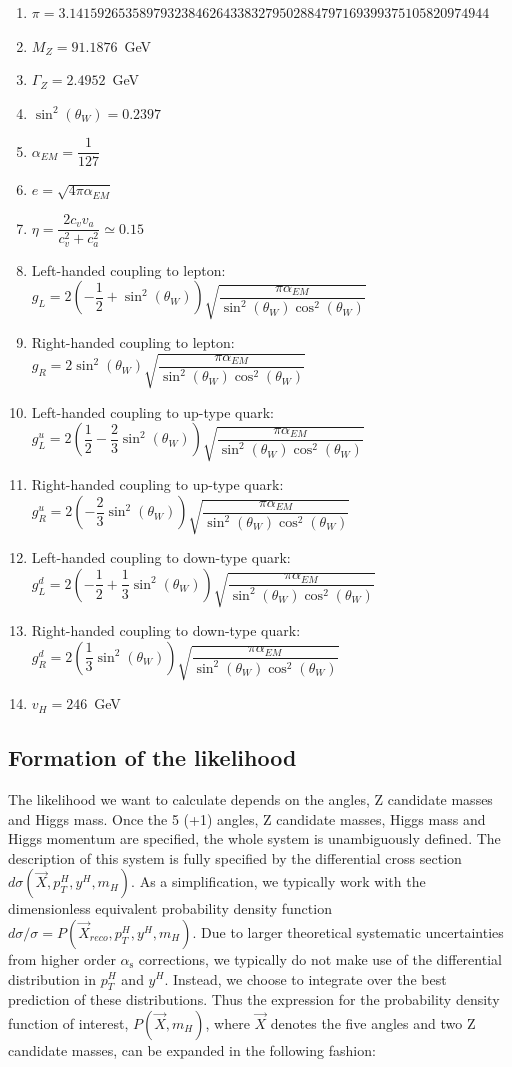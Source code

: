 \documentclass{cmspaper}
\begin{document}
\begin{enumerate}
\item $\pi = 3.141592653589793238462643383279502884797169399375105820974944$
\item $M_Z = 91.1876$~GeV
\item $\Gamma_Z = 2.4952$~GeV
\item $\sin^2(\theta_W) = 0.2397$
\item $\alpha_{EM} = \dfrac{1}{127}$
\item $e = \sqrt{4\pi\alpha_{EM}}$
\item $\eta = \dfrac{2 c_v v_a}{c_v^2 + c_a^2} \simeq 0.15$
\item Left-handed coupling to lepton:
   $g_L = 2\left(-\dfrac{1}{2}+\sin^2(\theta_W)\right)\sqrt{\dfrac{\pi\alpha_{EM}}{\sin^2(\theta_W)\cos^2(\theta_W)}}$
\item Right-handed coupling to lepton:
   $g_R = 2 \sin^2(\theta_W)\sqrt{\dfrac{\pi\alpha_{EM}}{\sin^2(\theta_W)\cos^2(\theta_W)}}$
\item Left-handed coupling to up-type quark:
   $g_L^u = 2\left(\dfrac{1}{2}-\dfrac{2}{3}\sin^2(\theta_W)\right)\sqrt{\dfrac{\pi\alpha_{EM}}{\sin^2(\theta_W)\cos^2(\theta_W)}}$
\item Right-handed coupling to up-type quark:
   $g_R^u = 2\left(-\dfrac{2}{3}\sin^2(\theta_W)\right)\sqrt{\dfrac{\pi\alpha_{EM}}{\sin^2(\theta_W)\cos^2(\theta_W)}}$
\item Left-handed coupling to down-type quark:
   $g_L^d = 2\left(-\dfrac{1}{2}+\dfrac{1}{3}\sin^2(\theta_W)\right)\sqrt{\dfrac{\pi\alpha_{EM}}{\sin^2(\theta_W)\cos^2(\theta_W)}}$
\item Right-handed coupling to down-type quark:
   $g_R^d = 2\left(\dfrac{1}{3}\sin^2(\theta_W)\right)\sqrt{\dfrac{\pi\alpha_{EM}}{\sin^2(\theta_W)\cos^2(\theta_W)}}$
\item $v_H = 246$~GeV
\end{enumerate}

\subsection{Formation of the likelihood}

The likelihood we want to calculate depends on the angles, Z candidate masses and Higgs mass.
Once the 5 (+1) angles, Z candidate masses, Higgs mass and Higgs momentum are specified,
the whole system is unambiguously defined.  The description of this system is fully specified by
the differential cross section $d\sigma (\vec{X}, p_T^H, y^H, m_H)$. As a simplification, 
we typically work with the dimensionless equivalent probability density function 
$d\sigma / \sigma = P(\vec{X}_{reco}, p_T^H, y^H, m_H)$. Due to larger theoretical systematic uncertainties from higher order
$\alpha_{\mathrm{s}}$ corrections, we typically do not make use of the differential distribution
in $p_{T}^{H}$ and $y^H$. Instead, we choose to integrate over the best prediction of these
distributions. Thus the expression for the probability density function of interest, 
$P(\vec{X}, m_H)$, where $\vec{X}$ denotes the five angles
and two Z candidate masses, can be expanded in the following fashion:
\end{document}
